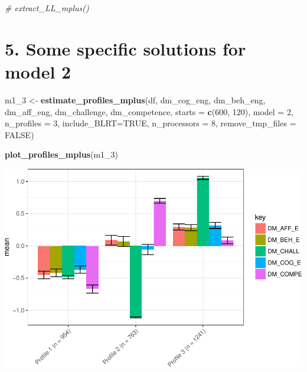 \documentclass[]{book}
\newenvironment{Shaded}{\begin{snugshade}}{\end{snugshade}}
\newcommand{\KeywordTok}[1]{\textcolor[rgb]{0.13,0.29,0.53}{\textbf{#1}}}
\newcommand{\DataTypeTok}[1]{\textcolor[rgb]{0.13,0.29,0.53}{#1}}
\newcommand{\DecValTok}[1]{\textcolor[rgb]{0.00,0.00,0.81}{#1}}
\newcommand{\StringTok}[1]{\textcolor[rgb]{0.31,0.60,0.02}{#1}}
\newcommand{\CommentTok}[1]{\textcolor[rgb]{0.56,0.35,0.01}{\textit{#1}}}
\newcommand{\OtherTok}[1]{\textcolor[rgb]{0.56,0.35,0.01}{#1}}
\newcommand{\NormalTok}[1]{#1}
\begin{document}
\begin{Shaded}
\begin{Highlighting}[]
\CommentTok{# extract_LL_mplus()}
\end{Highlighting}
\end{Shaded}

\section{5. Some specific solutions for model
2}\label{some-specific-solutions-for-model-2}

\begin{Shaded}
\begin{Highlighting}[]
\NormalTok{m1_}\DecValTok{3}\NormalTok{ <-}\StringTok{ }\KeywordTok{estimate_profiles_mplus}\NormalTok{(df,  }
\NormalTok{                             dm_cog_eng, dm_beh_eng, dm_aff_eng, dm_challenge, dm_competence,}
                             \DataTypeTok{starts =} \KeywordTok{c}\NormalTok{(}\DecValTok{600}\NormalTok{, }\DecValTok{120}\NormalTok{),}
                             \DataTypeTok{model =} \DecValTok{2}\NormalTok{,}
                             \DataTypeTok{n_profiles =} \DecValTok{3}\NormalTok{,}
                             \DataTypeTok{include_BLRT=}\OtherTok{TRUE}\NormalTok{,}
                             \DataTypeTok{n_processors =} \DecValTok{8}\NormalTok{, }\DataTypeTok{remove_tmp_files =} \OtherTok{FALSE}\NormalTok{)}

\KeywordTok{plot_profiles_mplus}\NormalTok{(m1_}\DecValTok{3}\NormalTok{)}
\end{Highlighting}
\end{Shaded}

\includegraphics{rosenberg-dissertation_files/figure-latex/spec-solutions-model2-3-1.pdf}
\end{document}
